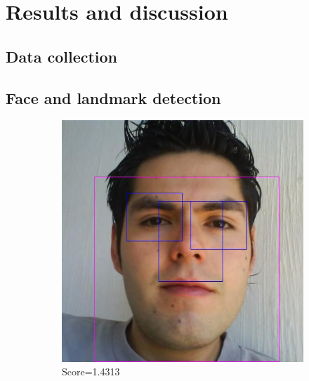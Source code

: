 \chapter{Results and discussion}
\label{results}
\section{Data collection}
\label{results:collection}

\section{Face and landmark detection}
\label{results:fd}

\begin{figure}
    \centering
    \begin{subfigure}[b]{0.3\textwidth}
      \includegraphics[width=\textwidth]{figures/spec/detected_cff0618f-f631-4b0d-80d9-f582fee46fad}
      \caption{Score=1.4313}
      \label{fig:spec:fd:good_detected1}
    \end{subfigure}
    \begin{subfigure}[b]{0.3\textwidth}

\end{subfigure}
\end{figure}
